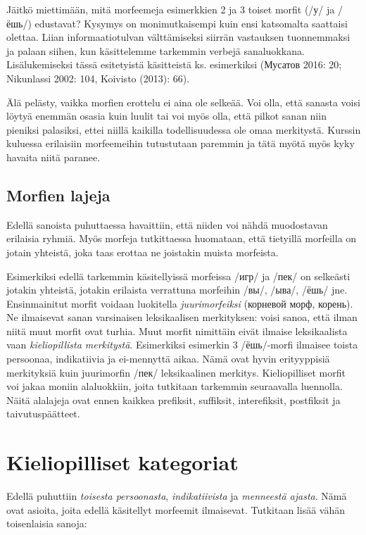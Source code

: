 \documentclass[]{scrreprt}
\begin{document}
Jäitkö miettimään, mitä morfeemeja esimerkkien 2 ja 3 toiset morfit (/у/
ja /ёшь/) edustavat? Kysymys on monimutkaisempi kuin ensi katsomalta
saattaisi olettaa. Liian informaatiotulvan välttämiseksi siirrän
vastauksen tuonnemmaksi ja palaan siihen, kun käsittelemme tarkemmin
verbejä sanaluokkana. Lisälukemiseksi tässä esitetyistä käsitteistä ks.
esimerkiksi (Мусатов 2016: 20; Nikunlassi 2002: 104, Koivisto (2013):
66).

Älä pelästy, vaikka morfien erottelu ei aina ole selkeää. Voi olla, että
sanasta voisi löytyä enemmän osasia kuin luulit tai voi myös olla, että
pilkot sanan niin pieniksi palasiksi, ettei niillä kaikilla
todellisuudessa ole omaa merkitystä. Kurssin kuluessa erilaisiin
morfeemeihin tutustutaan paremmin ja tätä myötä myös kyky havaita niitä
paranee.

\subsection{Morfien lajeja}\label{morfien-lajeja}

Edellä sanoista puhuttaessa havaittiin, että niiden voi nähdä
muodostavan erilaisia ryhmiä. Myös morfeja tutkittaessa huomataan, että
tietyillä morfeilla on jotain yhteistä, joka taas erottaa ne joistakin
muista morfeista.

Esimerkiksi edellä tarkemmin käsitellyissä morfeissa /игр/ ja /пек/ on
selkeästi jotakin yhteistä, jotakin erilaista verrattuna morfeihin /вы/,
/ыва/, /ёшь/ jne. Ensinmainitut morfit voidaan luokitella
\emph{juurimorfeiksi} (корневой морф, корень). Ne ilmaisevat sanan
varsinaisen leksikaalisen merkityksen: voisi sanoa, että ilman niitä
muut morfit ovat turhia. Muut morfit nimittäin eivät ilmaise
leksikaalista vaan \emph{kieliopillista merkitystä}. Esimerkiksi
esimerkin 3 /ёшь/-morfi ilmaisee toista persoonaa, indikatiivia ja
ei-mennyttä aikaa. Nämä ovat hyvin erityyppisiä merkityksiä kuin
juurimorfin /пек/ leksikaalinen merkitys. Kieliopilliset morfit voi
jakaa moniin alaluokkiin, joita tutkitaan tarkemmin seuraavalla
luennolla. Näitä alalajeja ovat ennen kaikkea prefiksit, suffiksit,
interefiksit, postfiksit ja taivutuspäätteet.

\section{Kieliopilliset kategoriat}\label{kieliopilliset-kategoriat}

Edellä puhuttiin \emph{toisesta persoonasta}, \emph{indikatiivista} ja
\emph{menneestä ajasta}. Nämä ovat asioita, joita edellä käsitellyt
morfeemit ilmaisevat. Tutkitaan lisää vähän toisenlaisia sanoja:
\end{document}
